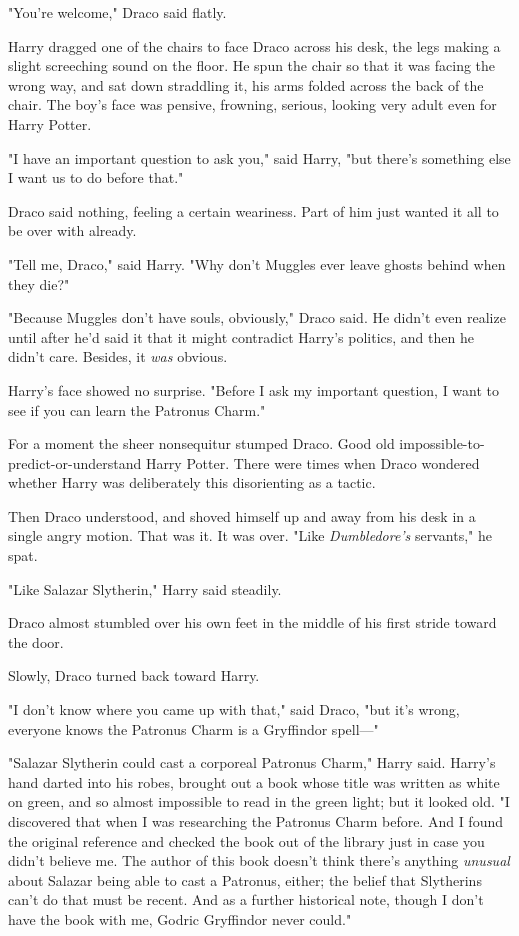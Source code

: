 "You're welcome," Draco said flatly.

Harry dragged one of the chairs to face Draco across his desk, the legs making 
a slight screeching sound on the floor. He spun the chair so that it was facing 
the wrong way, and sat down straddling it, his arms folded across the back of 
the chair. The boy's face was pensive, frowning, serious, looking very adult 
even for Harry Potter.

"I have an important question to ask you," said Harry, "but there's something 
else I want us to do before that."

Draco said nothing, feeling a certain weariness. Part of him just wanted it all 
to be over with already.

"Tell me, Draco," said Harry. "Why don't Muggles ever leave ghosts behind when 
they die?"

"Because Muggles don't have souls, obviously," Draco said. He didn't even 
realize until after he'd said it that it might contradict Harry's politics, and 
then he didn't care. Besides, it \emph{was} obvious.

Harry's face showed no surprise. "Before I ask my important question, I want to 
see if you can learn the Patronus Charm."

For a moment the sheer nonsequitur stumped Draco. Good old 
impossible-to-predict-or-understand Harry Potter. There were times when Draco 
wondered whether Harry was deliberately this disorienting as a tactic.

Then Draco understood, and shoved himself up and away from his desk in a single 
angry motion. That was it. It was over. "Like \emph{Dumbledore's} servants," he 
spat.

"Like Salazar Slytherin," Harry said steadily.

Draco almost stumbled over his own feet in the middle of his first stride 
toward the door.

Slowly, Draco turned back toward Harry.

"I don't know where you came up with that," said Draco, "but it's wrong, 
everyone knows the Patronus Charm is a Gryffindor spell---"

"Salazar Slytherin could cast a corporeal Patronus Charm," Harry said. Harry's 
hand darted into his robes, brought out a book whose title was written as white 
on green, and so almost impossible to read in the green light; but it looked 
old. "I discovered that when I was researching the Patronus Charm before. And I 
found the original reference and checked the book out of the library just in 
case you didn't believe me. The author of this book doesn't think there's 
anything \emph{unusual} about Salazar being able to cast a Patronus, either; 
the belief that Slytherins can't do that must be recent. And as a further 
historical note, though I don't have the book with me, Godric Gryffindor never 
could."

